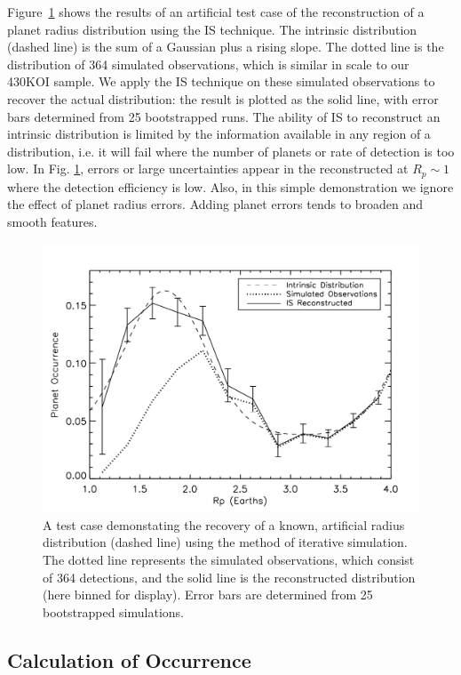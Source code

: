 Figure~\ref{fig:IS} shows the results of an artificial test case of
the reconstruction of a planet radius distribution using the IS technique.  
The intrinsic distribution (dashed line) is the sum of a Gaussian plus a
rising slope.  The dotted line is the distribution of 364 simulated 
observations, which is similar in scale to our
430KOI sample.  We apply the IS technique on these simulated
observations to recover the actual distribution: the result is plotted
as the solid line, with error bars determined from 25 bootstrapped
runs.  The ability of IS to reconstruct an intrinsic distribution is
limited by the information available in any region of a distribution,
i.e. it will fail where the number of planets or rate of detection is
too low.  In Fig. \ref{fig:IS}, errors or large uncertainties appear
in the reconstructed at $R_p \sim 1$\rearth{} where the detection
efficiency is low.  Also, in this simple demonstration we ignore the
effect of planet radius errors.  Adding planet errors tends to broaden
and smooth features.

\begin{figure}[h]
\centerline{\includegraphics[scale=0.55]{chap2/IStest.pdf}}
\caption{A test case demonstating the recovery of a known, artificial
  radius distribution (dashed line) using the method of iterative
  simulation.  The dotted line represents the simulated observations,
  which consist of 364 detections, and the solid line is the
  reconstructed distribution (here binned for display).  Error
  bars are determined from 25 bootstrapped simulations.}
\label{fig:IS}
\end{figure}

\subsection{Calculation of Occurrence}
\label{sec:calocc}


